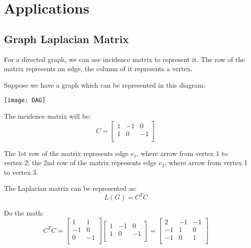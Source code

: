 \chapter{Applications}

\section{Graph Laplacian Matrix}
For a directed graph, we can use incidence matrix to represent it.
The row of the matrix represents an edge, the column of it represents a vertex.

\begin{example}
    Suppose we have a graph which can be represented in this diagram:

    \begin{center}
        \texttt{[image: DAG]}
        \label{fig:simpel-dag}
    \end{center}

    The incidence matrix will be:
   \[
        C = \begin{bmatrix}
            1& -1 & 0 \\
            1 & 0 & -1 \\
        \end{bmatrix}
   \] 

   The 1st row of the matrix represents edge \(e_1\), where arrow from vertex 1 to vertex 2; the 2nd row of the matrix represents edge \(e_2\), where arrow from vertex 1 to vertex 3. 

   The Laplacian matrix can be represented as:
    \[
        L(G) = C^T C
    \]

    Do the math:
    \[
        C^T C = 
        \begin{bmatrix}
            1 &  1 \\
            -1 &  0 \\
            0 &  -1 \\
        \end{bmatrix}
        \begin{bmatrix}
            1 & -1 &  0 \\
            1 & 0 &  -1 \\
        \end{bmatrix}
        =
        \begin{bmatrix}
            2 & -1 &  -1 \\
            -1 & 1 &  0 \\
            -1 & 0 &  1 \\
        \end{bmatrix}
    \] 


\end{example}
